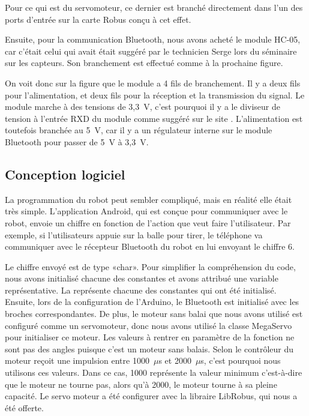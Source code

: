 
Pour ce qui est du servomoteur, ce dernier est branché directement dans l’un des ports d’entrée sur la carte Robus conçu à cet effet.

Ensuite, pour la communication Bluetooth, nous avons acheté le module HC-05, car c’était celui qui avait était suggéré par le technicien Serge lors du séminaire sur les capteurs.
Son branchement est effectué comme à la prochaine figure.


On voit donc sur la figure  que le module a 4 fils de branchement.
Il y a deux fils pour l’alimentation, et deux fils pour la réception et la transmission du signal.
Le module marche à des tensions de 3,3~V, c’est pourquoi il y a le diviseur de tension à l’entrée RXD du module comme suggéré sur le site \cite{noauthor_setting_nodate}.
L’alimentation est toutefois branchée au 5~V, car il y a un régulateur interne sur le module Bluetooth pour passer de 5~V à 3,3~V.

\subsection{Conception logiciel}



La programmation du robot peut sembler compliqué, mais en réalité elle était très simple.
L’application Android, qui est conçue pour communiquer avec le robot, envoie un chiffre en fonction de l’action que veut faire l’utilisateur.
Par exemple, si l’utilisateurs appuie sur la balle pour tirer, le téléphone va communiquer avec le récepteur Bluetooth du robot en lui envoyant le chiffre 6.


Le chiffre envoyé est de type «char».
Pour simplifier la compréhension du code, nous avons initialisé chacune des constantes et avons attribué une variable représentative.
La  représente chacune des constantes qui ont été initialisé.
Ensuite, lors de la configuration de l'Arduino, le Bluetooth est initialisé avec les broches correspondantes.
De plus, le moteur sans balai que nous avons utilisé est configuré comme un servomoteur, donc nous avons utilisé la classe MegaServo pour initialiser ce moteur.
Les valeurs à rentrer en paramètre de la fonction ne sont pas des angles puisque c’est un moteur sans balais.
Selon \cite{arduino_arduino_2019} le contrôleur du moteur reçoit une impulsion entre 1000~$\mu$s et 2000~$\mu$s, c’est pourquoi nous utilisons ces valeurs.
Dans ce cas, 1000 représente la valeur minimum c’est-à-dire que le moteur ne tourne pas, alors qu’à 2000, le moteur tourne à sa pleine capacité.
Le servo moteur a été configurer avec la libraire LibRobus, qui nous a été offerte.


